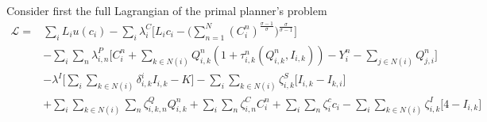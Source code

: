 \documentclass[11pt, oneside]{article}   	%
\begin{document}
\begin{spacing}{1.3}
Consider first the full Lagrangian of the primal planner's problem
\begin{equation}
  \begin{aligned}
    \mathcal{L} ={} & \sum_{i}^{} L_{i}u(c_{i}) - \sum_{i}^{}\lambda^{C}_{i}\bigg[L_{i}c_{i} - \bigg( \sum_{n=1}^{N} (C_{i}^{n})^{\frac{\sigma-1}{\sigma}}\bigg)^{\frac{\sigma}{\sigma-1}} \bigg] \\
  & - \sum_{i}^{}\sum_{n}^{}\lambda^{P}_{i,n}\bigg[ C_{i}^{n} + \sum_{k\in N(i)}^{}Q_{i,k}^{n}(1+\tau_{i,k}^{n}(Q_{i,k}^{n}, I_{i,k})) - Y_{i}^{n} - \sum_{j\in N(i)}^{}Q_{j,i}^{n} \bigg] \\
  & - \lambda^{I}\bigg[\sum_{i}^{}\sum_{k\in N(i)}^{}\delta^{i}_{i,k}I_{i,k} - K \bigg] - \sum_{i}^{}\sum_{k \in N(i)}^{}\zeta^{S}_{i,k}\bigg[ I_{i,k} - I_{k,i} \bigg] \\
  & + \sum_{i}^{}\sum_{k \in N(i)}^{}\sum_{n}^{} \zeta^{Q}_{i,k,n}Q_{i,k}^{n} + \sum_{i}^{}\sum_{n}^{} \zeta^{C}_{i,n}C_{i}^{n} + \sum_{i}^{}\sum_{n}^{} \zeta^{c}_{i}c_{i} - \sum_{i}^{}\sum_{k \in N(i)}^{} \zeta^{I}_{i,k}\bigg[4-I_{i,k}\bigg]
  \end{aligned}
\end{equation}


\end{spacing}
\end{document}
